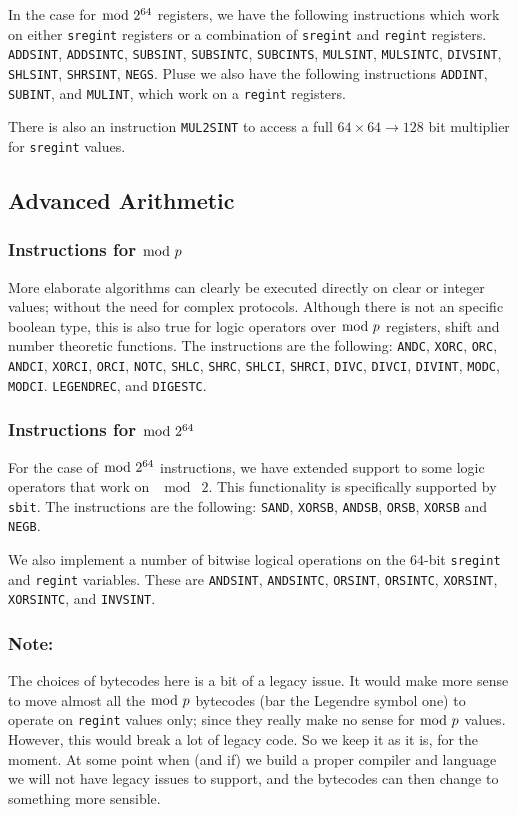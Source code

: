 In  the case for $\bmod \; 2^{64}$ registers, we have the following instructions
which work on either \verb|sregint| registers or a combination
of \verb|sregint| and \verb|regint| registers.
	\verb+ADDSINT+,
	\verb+ADDSINTC+,
	\verb+SUBSINT+,
	\verb+SUBSINTC+,
	\verb+SUBCINTS+,
	\verb+MULSINT+,
	\verb+MULSINTC+,
	\verb+DIVSINT+,
	\verb+SHLSINT+,
	\verb+SHRSINT+,
	\verb+NEGS+.
Pluse we also have the following instructions 
  \verb+ADDINT+,
  \verb+SUBINT+, and
  \verb+MULINT+,
which work on a \verb|regint| registers.

There is also an instruction \verb+MUL2SINT+ to access a
full $64 \times 64 \longrightarrow 128$ bit multiplier
for \verb|sregint| values.

\subsection{Advanced Arithmetic}
\subsubsection{Instructions for $\bmod \; p$}
More elaborate algorithms can clearly be executed directly on
clear or integer values; without the need for complex
protocols. Although there is not an specific boolean type, this is also true for logic operators over $\bmod \; p$ registers, shift and number
theoretic functions. The instructions are the following:
    \verb+ANDC+,
    \verb+XORC+,
    \verb+ORC+,
    \verb+ANDCI+,
    \verb+XORCI+,
    \verb+ORCI+,
    \verb+NOTC+,
    \verb+SHLC+,
    \verb+SHRC+,
    \verb+SHLCI+,
    \verb+SHRCI+,
    \verb+DIVC+,
    \verb+DIVCI+,
    \verb+DIVINT+,
    \verb+MODC+,
    \verb+MODCI+.
    \verb+LEGENDREC+,
and
    \verb+DIGESTC+.
\subsubsection{Instructions for $\bmod \; 2^{64}$}
For the case of $\bmod \; 2^{64}$ instructions, we have extended support to some logic operators that work on $\mod \; 2$. 
This functionality is specifically supported by \verb+sbit+. 
The instructions are the following: 
\verb+SAND+,
\verb+XORSB+,
\verb+ANDSB+,
\verb+ORSB+,
\verb+XORSB+ and
\verb+NEGB+.

We also implement a number of bitwise logical operations on the $64$-bit
\verb|sregint| and \verb|regint| variables. These are
\verb+ANDSINT+, 
\verb+ANDSINTC+,
\verb+ORSINT+, 
\verb+ORSINTC+,
\verb+XORSINT+, 
\verb+XORSINTC+,
and
\verb+INVSINT+.

\subsubsection{Note:}
The choices of bytecodes here is a bit of a legacy issue. It would
make more sense to move almost all the $\bmod \; p$ bytecodes (bar the Legendre symbol
one) to operate on \verb|regint| values only; since they really make
no sense for $\bmod \; p$ values. However, this would break a lot of legacy code.
So we keep it as it is, for the moment. At some point when (and if) we build a proper
compiler and language we will not have legacy issues to support, and the
bytecodes can then change to something more sensible.

